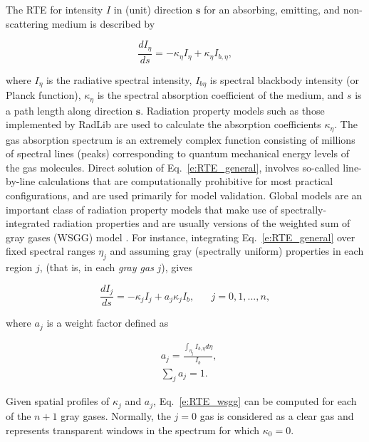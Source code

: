 \documentclass[preprint,12pt, a4paper]{elsarticle}
\begin{document}
The RTE for intensity $I$ in (unit) direction $\mathbf{s}$ for an absorbing, emitting, and non-scattering medium is described by
% 
\begin{linenomath}
\begin{equation} \label{e:RTE_general}
    \frac{dI_{\eta}}{ds} = -\kappa_{\eta}I_{\eta} + \kappa_{\eta}I_{b,\eta},
\end{equation}
\end{linenomath}
%
where $I_{\eta}$ is the radiative spectral intensity, 
$I_{b\eta}$ is spectral blackbody intensity (or Planck function), 
$\kappa_{\eta}$ is the spectral absorption coefficient of the medium, and $s$ is a path length along direction $\mathbf{s}$. Radiation property models such as those implemented by RadLib are used to calculate the absorption coefficients $\kappa_{\eta}$. 
%
The gas absorption spectrum is an extremely complex function consisting of millions of spectral lines (peaks) corresponding to quantum mechanical energy levels of the gas molecules.
Direct solution of Eq.~\ref{e:RTE_general}, involves so-called line-by-line calculations that are computationally prohibitive for most practical configurations, and are used primarily for model validation. Global models are an important class of radiation property models that make use of spectrally-integrated radiation properties and are usually versions of the weighted sum of gray gases (WSGG) model \cite{Hottel_1967,Modest_2013}. For instance, integrating Eq.~\ref{e:RTE_general} over fixed spectral ranges $\eta_j$ and assuming gray (spectrally uniform) properties in each region $j$, (that is, in each \emph{gray gas} $j$), gives
%
\begin{linenomath}
\begin{equation} \label{e:RTE_wsgg}
	\frac{dI_j}{ds} = -\kappa_jI_j + a_j\kappa_jI_b, \hspace{20pt} j=0,1,...,n,
\end{equation}
\end{linenomath}
%
where $a_j$ is a weight factor defined as
%
\begin{linenomath}
\begin{align}
    &a_j= \frac{\int_{\eta_j}I_{b,\eta}d\eta}{I_b},\\
    &\sum_j a_j = 1.
\end{align}
\end{linenomath}
%
Given spatial profiles of $\kappa_j$ and $a_j$, Eq.~\ref{e:RTE_wsgg} can be computed for each of the $n+1$ gray gases. Normally, the $j=0$ gas is considered as a clear gas and represents transparent windows in the spectrum for which $\kappa_0=0$.
\end{document}

